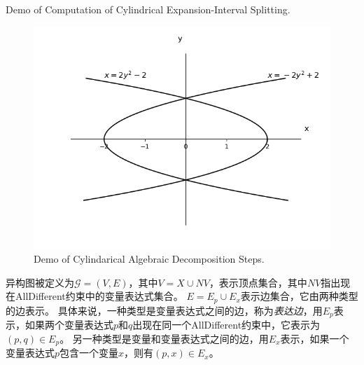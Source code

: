 \begin{example}

\end{example}

\begin{table}[]
    \centering
         {Demo of Computation of Cylindrical Expansion-Interval Splitting.}
\label{tab:expansion}
\end{table}

\begin{figure}[t]
    \centering
    \includegraphics[width=\columnwidth]{Img/cad.png}
     {Demo of Cylindarical Algebraic Decomposition Steps.}
\label{fig:CAD}
\end{figure}


\begin{definition}
    异构图被定义为$\mathcal{G} = (V, E)$，其中$V = X\cup NV$，表示顶点集合，其中$NV$指出现在AllDifferent约束中的变量表达式集合。
    $E = E_p \cup E_x$表示边集合，它由两种类型的边表示。
    具体来说，一种类型是变量表达式之间的边，称为\textit{表达边}，用$E_p$表示，如果两个变量表达式$p$和$q$出现在同一个AllDifferent约束中，它表示为$(p, q) \in E_p$。
    另一种类型是变量和变量表达式之间的边，用$E_x$表示，如果一个变量表达式$p$包含一个变量$x$，则有$(p, x) \in E_x$。
\end{definition}

